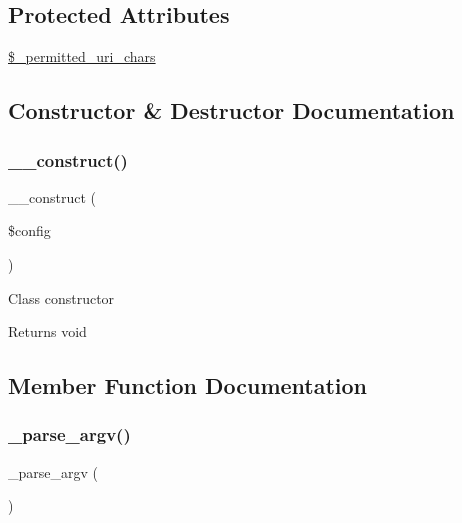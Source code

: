 \subsection*{Protected Attributes}
\begin{DoxyCompactItemize}
\item 
\mbox{\hyperlink{class_c_i___u_r_i_a5f6c67e88b35c1006295f41bc878f8b7}{\$\+\_\+permitted\+\_\+uri\+\_\+chars}}
\end{DoxyCompactItemize}


\subsection{Constructor \& Destructor Documentation}
\mbox{\label{class_c_i___u_r_i_ab7da97fbbffcd188093b4674ef948335}} 
\subsubsection{\texorpdfstring{\+\_\+\+\_\+construct()}{\_\_construct()}}
{\footnotesize\ttfamily \+\_\+\+\_\+construct (\begin{DoxyParamCaption}\item[{\mbox{\hyperlink{class_c_i___config}{C\+I\+\_\+\+Config}}}]{\$config }\end{DoxyParamCaption})}

Class constructor

\begin{DoxyReturn}{Returns}
void 
\end{DoxyReturn}


\subsection{Member Function Documentation}
\mbox{\label{class_c_i___u_r_i_a336e05909197d401613263ebdab6550c}} 
\subsubsection{\texorpdfstring{\+\_\+parse\+\_\+argv()}{\_parse\_argv()}}
{\footnotesize\ttfamily \+\_\+parse\+\_\+argv (\begin{DoxyParamCaption}{ }\end{DoxyParamCaption})\hspace{0.3cm}{\ttfamily [protected]}}

